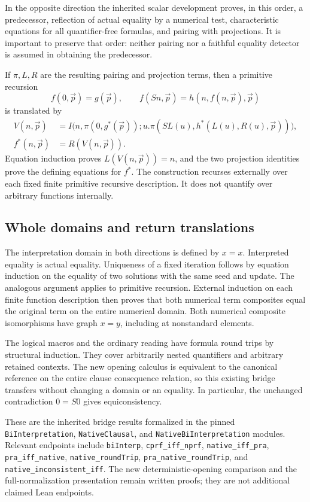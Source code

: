 \documentclass[11pt,letterpaper]{article}
\theoremstyle{definition}
\begin{document}
In the opposite direction the inherited scalar development proves, in
this order, a predecessor, reflection of actual equality by a numerical
test, characteristic equations for all quantifier-free formulas, and
pairing with projections.  It is important to preserve that order:
neither pairing nor a faithful equality detector is assumed in obtaining
the predecessor.

If $\pi,L,R$ are the resulting pairing and projection terms, then a
primitive recursion
\[
 f(0,\vec p)=g(\vec p),\qquad
 f(Sn,\vec p)=h(n,f(n,\vec p),\vec p)
\]
is translated by
\[
\begin{aligned}
 V(n,\vec p)&=
 I\bigl(n,\pi(0,g^*(\vec p));
      u.\pi(SL(u),h^*(L(u),R(u),\vec p))\bigr),\\
 f^*(n,\vec p)&=R(V(n,\vec p)).
\end{aligned}
\]
Equation induction proves $L(V(n,\vec p))=n$, and the two projection
identities prove the defining equations for $f^*$.  The construction
recurses externally over each fixed finite primitive recursive
description.  It does not quantify over arbitrary functions internally.

\subsection{Whole domains and return translations}

The interpretation domain in both directions is defined by $x=x$.
Interpreted equality is actual equality.  Uniqueness of a fixed iteration
follows by equation induction on the equality of two solutions with the
same seed and update.  The analogous argument applies to primitive
recursion.  External induction on each finite function description then
proves that both numerical term composites equal the original term on
the entire numerical domain.  Both numerical composite isomorphisms have
graph $x=y$, including at nonstandard elements.

The logical macros and the ordinary reading have formula round trips by
structural induction.  They cover arbitrarily nested quantifiers and
arbitrary retained contexts.  The new opening calculus is equivalent to
the canonical reference on the entire clause consequence relation, so
this existing bridge transfers without changing a domain or an equality.
In particular, the unchanged contradiction $0=S0$ gives equiconsistency.

These are the inherited bridge results formalized in the pinned
\texttt{BiInterpretation}, \texttt{NativeClausal}, and
\texttt{NativeBiInterpretation} modules.\cite{native} Relevant endpoints include
\texttt{biInterp}, \texttt{cprf\_iff\_nprf},
\texttt{native\_iff\_pra}, \texttt{pra\_iff\_native},
\texttt{native\_roundTrip}, \texttt{pra\_native\_roundTrip}, and
\texttt{native\_inconsistent\_iff}.  The new deterministic-opening
comparison and the full-normalization presentation remain written proofs;
they are not additional claimed Lean endpoints.
\end{document}

